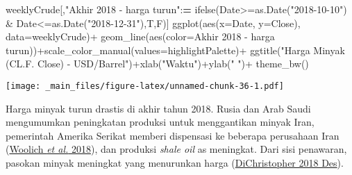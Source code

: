 \documentclass[
]{book}
\newenvironment{Shaded}{\begin{snugshade}}{\end{snugshade}}
\newcommand{\AttributeTok}[1]{\textcolor[rgb]{0.77,0.63,0.00}{#1}}
\newcommand{\ErrorTok}[1]{\textcolor[rgb]{0.64,0.00,0.00}{\textbf{#1}}}
\newcommand{\FunctionTok}[1]{\textcolor[rgb]{0.00,0.00,0.00}{#1}}
\newcommand{\NormalTok}[1]{#1}
\newcommand{\SpecialCharTok}[1]{\textcolor[rgb]{0.00,0.00,0.00}{#1}}
\newcommand{\StringTok}[1]{\textcolor[rgb]{0.31,0.60,0.02}{#1}}
\begin{document}
\begin{Shaded}
\begin{Highlighting}[]
\NormalTok{weeklyCrude[,}\StringTok{"Akhir 2018 {-} harga turun"}\SpecialCharTok{:}\ErrorTok{=}
              \FunctionTok{ifelse}\NormalTok{(Date}\SpecialCharTok{\textgreater{}=}\FunctionTok{as.Date}\NormalTok{(}\StringTok{"2018{-}10{-}10"}\NormalTok{) }\SpecialCharTok{\&}\NormalTok{ Date}\SpecialCharTok{\textless{}=}\FunctionTok{as.Date}\NormalTok{(}\StringTok{"2018{-}12{-}31"}\NormalTok{),T,F)]}
\FunctionTok{ggplot}\NormalTok{(}\FunctionTok{aes}\NormalTok{(}\AttributeTok{x=}\NormalTok{Date, }\AttributeTok{y=}\NormalTok{Close),}
       \AttributeTok{data=}\NormalTok{weeklyCrude)}\SpecialCharTok{+}
  \FunctionTok{geom\_line}\NormalTok{(}\FunctionTok{aes}\NormalTok{(}\AttributeTok{color=}\StringTok{\textasciigrave{}}\AttributeTok{Akhir 2018 {-} harga turun}\StringTok{\textasciigrave{}}\NormalTok{))}\SpecialCharTok{+}\FunctionTok{scale\_color\_manual}\NormalTok{(}\AttributeTok{values=}\NormalTok{highlightPalette)}\SpecialCharTok{+}
  \FunctionTok{ggtitle}\NormalTok{(}\StringTok{"Harga Minyak (CL.F. Close) {-} USD/Barrel"}\NormalTok{)}\SpecialCharTok{+}\FunctionTok{xlab}\NormalTok{(}\StringTok{"Waktu"}\NormalTok{)}\SpecialCharTok{+}\FunctionTok{ylab}\NormalTok{(}\StringTok{" "}\NormalTok{)}\SpecialCharTok{+}
  \FunctionTok{theme\_bw}\NormalTok{()}
\end{Highlighting}
\end{Shaded}

\texttt{[image: \_main\_files/figure-latex/unnamed-chunk-36-1.pdf]}

Harga minyak turun drastis di akhir tahun 2018. Rusia dan Arab Saudi mengumumkan peningkatan produksi untuk menggantikan minyak Iran, pemerintah Amerika Serikat memberi dispensasi ke beberapa perusahaan Iran (\protect\hyperlink{ref-woolich_sanctions_nodate}{Woolich \emph{et al.} 2018}), dan produksi \emph{shale oil} as meningkat. Dari sisi penawaran, pasokan minyak meningkat yang menurunkan harga (\protect\hyperlink{ref-dichristopher_us_2018}{DiChristopher 2018 Des}).
\end{document}
